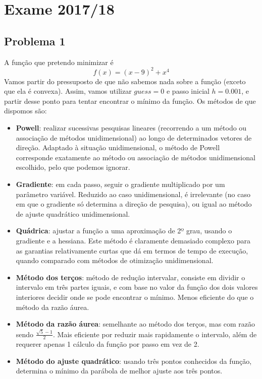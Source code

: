 \setcounter{chapter}{16}
\chapter{Exame 2017/18}
{
\renewcommand{\thesubsection}{\thesection\alph{subsection}}

\section{Problema 1}
A função que pretendo minimizar é
\begin{equation*}
    f(x)=(x-9)^2+x^4
\end{equation*}
Vamos partir do pressuposto de que não sabemos nada sobre a função (exceto que ela é convexa). Assim, vamos utilizar $guess=0$ e passo inicial $h=0.001$, e partir desse ponto para tentar encontrar o mínimo da função.
Os métodos de que dispomos são:
\begin{itemize}
    \item \textbf{Powell}: realizar sucessivas pesquisas lineares (recorrendo a um método ou associação de métodos unidimensional) ao longo de determinados vetores de direção. Adaptado à situação unidimensional, o método de Powell corresponde exatamente ao método ou associação de métodos unidimensional escolhido, pelo que podemos ignorar.
    \item \textbf{Gradiente}: em cada passo, seguir o gradiente multiplicado por um parâmetro variável. Reduzido ao caso unidimensional, é irrelevante (no caso em que o gradiente só determina a direção de pesquisa), ou igual ao método de ajuste quadrático unidimensional.
    \item \textbf{Quádrica}: ajustar a função a uma aproximação de 2º grau, usando o gradiente e a hessiana. Este método é claramente demasiado complexo para as garantias relativamente curtas que dá em termos de tempo de execução, quando comparado com métodos de otimização unidimensional.
    \item \textbf{Método dos terços}: método de redução intervalar, consiste em dividir o intervalo em três partes iguais, e com base no valor da função dos dois valores interiores decidir onde se pode encontrar o mínimo. Menos eficiente do que o método da razão áurea.
    \item \textbf{Método da razão áurea}: semelhante ao método dos terços, mas com razão sendo $\frac{\sqrt{5}-1}{2}$. Mais eficiente por reduzir mais rapidamente o intervalo, além de requerer apenas 1 cálculo da função por passo em vez de 2.
    \item \textbf{Método do ajuste quadrático}: usando três pontos conhecidos da função, determina o mínimo da parábola de melhor ajuste aos três pontos.

\end{itemize}}
